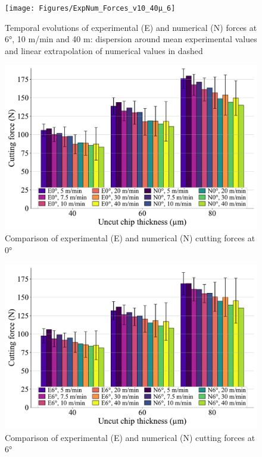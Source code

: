 \documentclass[final,5p,times,twocolumn]{elsarticle}
\begin{document}
\begin{figure}[h]
\centering
\texttt{[image: Figures/ExpNum\_Forces\_v10\_40µ\_6]}
\caption{Temporal evolutions of experimental (E) and numerical (N) forces at 6°, 10 m/min and 40 \textmu{}m: dispersion around mean experimental values and linear extrapolation of numerical values in dashed}
\label{ExpNum_Forces_v10_40µ_6}
\end{figure}

\begin{figure}[h]
\centering
\includegraphics[width=\columnwidth]{Figures/Fx_0}
\caption{Comparison of experimental (E) and numerical (N) cutting forces at 0°}
\label{Fx_0}
\end{figure}

\begin{figure}[h]
\centering
\includegraphics[width=\columnwidth]{Figures/Fx_6}
\caption{Comparison of experimental (E) and numerical (N) cutting forces at 6°}
\label{Fx_6}
\end{figure}
\end{document}
